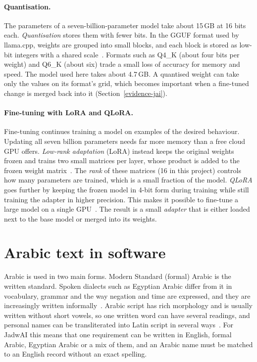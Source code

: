 \paragraph{Quantisation.} The parameters of a seven-billion-parameter model take about 15\,GB at 16 bits each. \emph{Quantisation} stores them with fewer bits. In the GGUF format used by llama.cpp, weights are grouped into small blocks, and each block is stored as low-bit integers with a shared scale~\cite{llamacpp}. Formats such as Q4\_K (about four bits per weight) and Q6\_K (about six) trade a small loss of accuracy for memory and speed. The model used here takes about 4.7\,GB. A quantised weight can take only the values on its format's grid, which becomes important when a fine-tuned change is merged back into it (Section~\ref{evidence-jai}).

\paragraph{Fine-tuning with LoRA and QLoRA.} Fine-tuning continues training a model on examples of the desired behaviour. Updating all seven billion parameters needs far more memory than a free cloud GPU offers. \emph{Low-rank adaptation} (LoRA) instead keeps the original weights frozen and trains two small matrices per layer, whose product is added to the frozen weight matrix~\cite{hu2022lora}. The \emph{rank} of these matrices (16 in this project) controls how many parameters are trained, which is a small fraction of the model. \emph{QLoRA} goes further by keeping the frozen model in 4-bit form during training while still training the adapter in higher precision. This makes it possible to fine-tune a large model on a single GPU~\cite{dettmers2023qlora}. The result is a small \emph{adapter} that is either loaded next to the base model or merged into its weights.

\section{Arabic text in software}\label{bg-arabic}

Arabic is used in two main forms. Modern Standard (formal) Arabic is the written standard. Spoken dialects such as Egyptian Arabic differ from it in vocabulary, grammar and the way negation and time are expressed, and they are increasingly written informally~\cite{habash2010arabic}. Arabic script has rich morphology and is usually written without short vowels, so one written word can have several readings, and personal names can be transliterated into Latin script in several ways~\cite{habash2010arabic}. For JadwAI this means that one requirement can be written in English, formal Arabic, Egyptian Arabic or a mix of them, and an Arabic name must be matched to an English record without an exact spelling.

